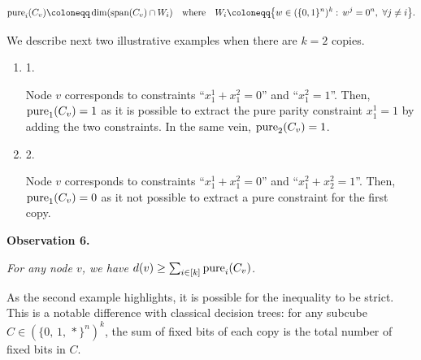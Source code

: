 \documentclass[10pt,a4paper]{article}
\begin{document}
\[\begin{gathered}
\mathop{\textup{pure}}\nolimits_{i}(C_{v})\coloneqq\dim(\textup{span}(C_{v})\cap W_{i})\quad\text{where}\quad W_{i}\coloneqq\big{\{}w\in(\{0,1\}^{n})^{k}:\,w^{j}=0^{n},\ \forall j\neq i\big{\}}.
\end{gathered}\]


We describe next two illustrative examples when there are $k=2$ copies.\par


\begin{enumerate}


\item[] 
1. 


Node $v$ corresponds to constraints “$x^{1}_{1}+x^{2}_{1}=0$” and “$x^{2}_{1}=1$”. Then, $\mathop{\textup{pure}}_{1}(C_{v})=1$ as it is possible to extract the pure parity constraint $x^{1}_{1}=1$ by adding the two constraints. In the same vein, $\mathop{\textup{pure}}_{2}(C_{v})=1$.\par





\item[] 
2. 


Node $v$ corresponds to constraints “$x^{1}_{1}+x^{2}_{1}=0$” and “$x^{2}_{1}+x^{2}_{2}=1$”. Then, $\mathop{\textup{pure}}_{1}(C_{v})=0$ as it not possible to extract a pure constraint for the first copy.\par





\end{enumerate}





\par\medskip\noindent\textbf{
\textbf{Observation 6}\textbf{.}
}\par



\emph{For any node $v$, we have $d(v)\geq\sum_{i\in[k]}\mathop{\textup{pure}}_{i}(C_{v})$.}\par






As the second example highlights, it is possible for the inequality to be strict. This is a notable difference with classical decision trees: for any subcube $C\in(\{0,\,1,\,*\}^{n})^{k}$, the sum of fixed bits of each copy is the total number of fixed bits in $C$.\par
\end{document}
